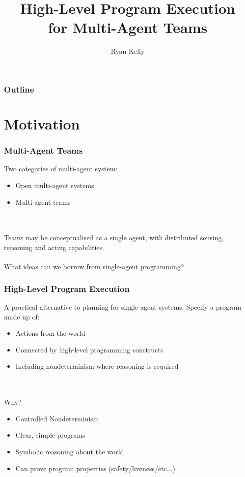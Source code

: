 \documentclass{beamer}
\title{High-Level Program Execution\\ for Multi-Agent Teams}
\author{Ryan Kelly}
\begin{document}
\begin{frame}
  \titlepage
\end{frame}

\begin{frame}
  \frametitle{Outline}
  \tableofcontents
\end{frame}

\section{Motivation}

\begin{frame}
\frametitle{Multi-Agent Teams}
Two categories of multi-agent system:
\begin{itemize}
  \item Open multi-agent systems
  \item Multi-agent teams
\end{itemize}
\ \\
\ \\
Teams may be conceptualised as a single agent, with distributed sensing,
reasoning and acting capabilities.\\
\ \\
\pause
What ideas can we borrow from single-agent programming?
\end{frame}

\begin{frame}
\frametitle{High-Level Program Execution}
A practical alternative to planning for single-agent systems. Specify
a program made up of:
\begin{itemize}
  \item Actions from the world
  \item Connected by high-level programming constructs
  \item Including nondeterminism where reasoning is required
\end{itemize}
\ \\
\ \\
Why?
\begin{itemize}
  \item Controlled Nondeterminism
  \item Clear, simple programs
  \item Symbolic reasoning about the world
  \item Can prove program properties (safety/liveness/etc...)
\end{itemize}
\end{frame}
\end{document}

